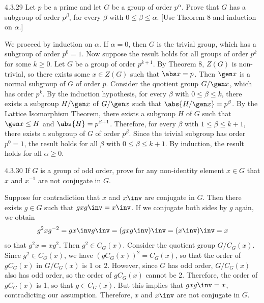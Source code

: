 \begin{exercise}{4.3.29}
	Let $p$ be a prime and let $G$ be a group of order $p^\alpha$.
	Prove that $G$ has a subgroup of order $p^\beta$, for every $\beta$ with $0 \leq \beta \leq \alpha$. [Use Theorem 8 and induction on $\alpha$.]
\end{exercise}

\begin{sol}
	We proceed by induction on $\alpha$.
	If $\alpha = 0$, then $G$ is the trivial group, which has a subgroup of order $p^0 = 1$.
	Now suppose the result holds for all groups of order $p^k$ for some $k \geq 0$.
	Let $G$ be a group of order $p^{k + 1}$.
	By Theorem 8, $Z(G)$ is non-trivial, so there exists some $x \in Z(G)$ such that $\abs x = p$.
	Then $\gen x$ is a normal subgroup of $G$ of order $p$.
	Consider the quotient group $G/\gen x$, which has order $p^k$.
	By the induction hypothesis, for every $\beta$ with $0 \leq \beta \leq k$, there exists a subgroup $H/\gen x$ of $G/\gen x$ such that $\abs{H/\gen x} = p^\beta$.
	By the Lattice Isomorphism Theorem, there exists a subgroup $H$ of $G$ such that $\gen x \leq H$ and $\abs{H} = p^{\beta + 1}$.
	Therefore, for every $\beta$ with $1 \leq \beta \leq k + 1$, there exists a subgroup of $G$ of order $p^\beta$.
	Since the trivial subgroup has order $p^0 = 1$, the result holds for all $\beta$ with $0 \leq \beta \leq k + 1$.
	By induction, the result holds for all $\alpha \geq 0$.
\end{sol}

\begin{exercise}{4.3.30}
	If $G$ is a group of odd order, prove for any non-identity element $x \in G$ that $x$ and $x^{-1}$ are not conjugate in $G$.
\end{exercise}

\begin{sol}
	Suppose for contradiction that $x$ and $x\inv$ are conjugate in $G$.
	Then there exists $g \in G$ such that $gxg\inv = x\inv$.
	If we conjugate both sides by $g$ again, we obtain
	\[
		g^2xg^{-2} = gx\inv g\inv = (gxg\inv)\inv = (x\inv)\inv = x
	\]
	so that $g^2x = xg^2$.
	Then $g^2 \in C_G(x)$.
	Consider the quotient group $G/C_G(x)$.
	Since $g^2 \in C_G(x)$, we have $(gC_G(x))^2 = C_G(x)$, so that the order of $gC_G(x)$ in $G/C_G(x)$ is 1 or 2.
	However, since $G$ has odd order, $G/C_G(x)$ also has odd order, so the order of $gC_G(x)$ cannot be 2.
	Therefore, the order of $gC_G(x)$ is 1, so that $g \in C_G(x)$.
	But this implies that $gxg\inv = x$, contradicting our assumption.
	Therefore, $x$ and $x\inv$ are not conjugate in $G$.
\end{sol}

